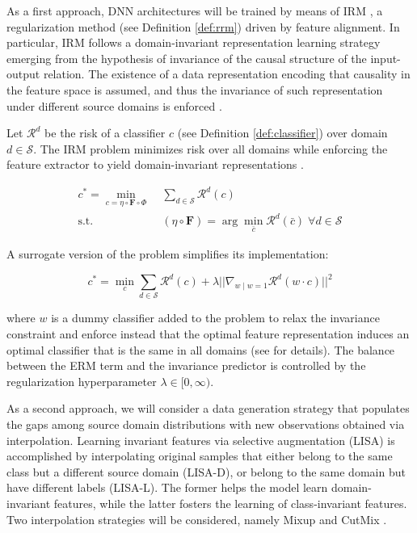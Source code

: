 As a first approach, DNN architectures will be trained by means of IRM
\cite{arjovskyInvariantRiskMinimization2020}, a regularization method 
(see Definition \ref{def:rrm}) driven by feature alignment. In particular, IRM
follows a domain-invariant representation learning strategy emerging from
the hypothesis of invariance of the causal structure of the input-output
relation. The existence of a data representation encoding that causality
in the feature space is assumed, and thus the invariance of such representation
under different source domains is enforced
\cite{liuOutOfDistributionGeneralizationSurvey2023}. \\

\begin{definition}[IRM]
    Let $\mathcal{R}^d$ be the risk of a classifier $c$ (see Definition \ref{def:classifier}) 
    over domain $d \in \mathcal{S}$. The IRM problem minimizes risk over all domains
    while enforcing the feature extractor to yield domain-invariant representations
    \cite{arjovskyInvariantRiskMinimization2020}.

    $$
        \begin{aligned}
            c^* = \min_{c = \eta \circ \bm{F} \circ \Phi} & \; \sum_{d \in \mathcal{S}} \mathcal{R}^d(c) \\
            \text{s.t.} & \; (\eta \circ \bm{F}) = \arg \min_{\bar{c}} \mathcal{R}^d(\bar{c}) \; \forall d \in \mathcal{S}
        \end{aligned}
    $$

    A surrogate version of the problem simplifies its implementation:

    $$
        c^* = \min_{c} \sum_{d \in \mathcal{S}} \mathcal{R}^d(c) + \lambda || \nabla_{w \mid w = 1} \mathcal{R}^d(w \cdot c) ||^2
    $$

    where $w$ is a dummy classifier added to the problem to relax the invariance
    constraint and enforce instead that the optimal feature representation induces
    an optimal classifier that is the same in all domains (see
    \cite{arjovskyInvariantRiskMinimization2020} for details). The balance between
    the ERM term and the invariance predictor is controlled by
    the regularization hyperparameter $\lambda \in [0, \infty)$.
\end{definition}

As a second approach, we will consider a data generation strategy
that populates the gaps among source domain distributions with new 
observations obtained via interpolation. Learning invariant
features via selective augmentation (LISA) is accomplished by interpolating 
original samples that either belong to the same class but a 
different source domain (LISA-D), or belong to the same domain but have 
different labels (LISA-L). 
The former helps the model learn domain-invariant features, while the latter
fosters the learning of class-invariant features. Two interpolation
strategies will be considered, namely Mixup 
\cite{zhangMixupEmpiricalRisk2018}
and CutMix
\cite{yunCutMixRegularizationStrategy2019}.

